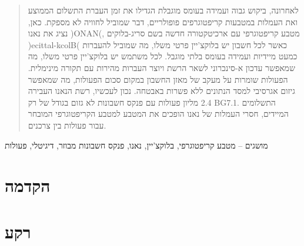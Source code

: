 \documentclass[journal]{IEEEtran}
\begin{document}

\begin{abstract}
לאחרונה, ביקוש גבוה ועמידה בעומס מוגבלת הגדילו את זמן העברת התשלום הממוצע ואת העמלות במטבעות קריפטוגרפים פופולריים, דבר שמוביל לחוויה לא מספקת. כאן, נציג את נאנו )ONAN(, מטבע קריפטוגרפי עם ארכיטקטורה חדשה בשם סריג-בלוקים )ecittal-kcolB( כאשר לכל חשבון יש בלוקצ'יין פרטי משלו, מה שמוביל להעברות כמעט מיידיות ועמידה בעומס בלתי מוגבל. לכל משתמש יש בלוקצ'יין פרטי משלו, מה שמאפשר עדכון א-סינכרוני לשאר הרשת ויוצר העברות מהירות עם תקורה מינימלית. הפעולות שומרות על מעקב של מאזן החשבון במקום סכום הפעולות, מה שמאפשר גיזום אגרסיבי למסד הנתונים ללא פשרות באבטחה. נכון לעכשיו, רשת הנאנו העבירה 2.4 מליון פעולות עם פנקס חשבונות לא גזום בגודל של רק BG7.1. התשלומים המיידים, חסרי העמלות של נאנו הופכים את המטבע למטבע הקריפטוגרפי המובחר עבור פעולות בין צרכנים.
\end{abstract}





מושגים – מטבע קריפטוגרפי, בלוקצ'יין, נאנו, פנקס חשבונות מבוזר, דיגיטלי, פעולות



%
\IEEEpeerreviewmaketitle



\section{הקדמה}


\section{רקע}

\end{document}
